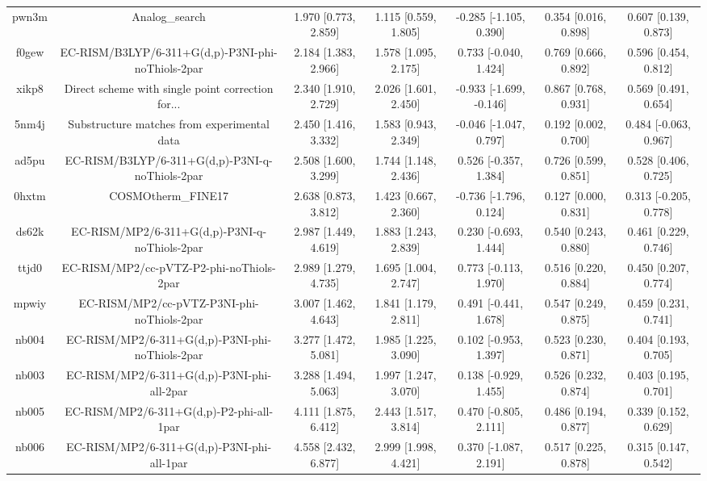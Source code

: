 \documentclass{article}
\begin{document}
\begin{center}
\begin{longtable}{|ccccccc|}
 pwn3m &                                     Analog\_search &  1.970 [0.773, 2.859] &  1.115 [0.559, 1.805] &   -0.285 [-1.105, 0.390] &  0.354 [0.016, 0.898] &   0.607 [0.139, 0.873] \\
 f0gew &  EC-RISM/B3LYP/6-311+G(d,p)-P3NI-phi-noThiols-2par &  2.184 [1.383, 2.966] &  1.578 [1.095, 2.175] &    0.733 [-0.040, 1.424] &  0.769 [0.666, 0.892] &   0.596 [0.454, 0.812] \\
 xikp8 &  Direct scheme with single point correction for... &  2.340 [1.910, 2.729] &  2.026 [1.601, 2.450] &  -0.933 [-1.699, -0.146] &  0.867 [0.768, 0.931] &   0.569 [0.491, 0.654] \\
 5nm4j &        Substructure matches from experimental data &  2.450 [1.416, 3.332] &  1.583 [0.943, 2.349] &   -0.046 [-1.047, 0.797] &  0.192 [0.002, 0.700] &  0.484 [-0.063, 0.967] \\
 ad5pu &    EC-RISM/B3LYP/6-311+G(d,p)-P3NI-q-noThiols-2par &  2.508 [1.600, 3.299] &  1.744 [1.148, 2.436] &    0.526 [-0.357, 1.384] &  0.726 [0.599, 0.851] &   0.528 [0.406, 0.725] \\
 0hxtm &                                 COSMOtherm\_FINE17 &  2.638 [0.873, 3.812] &  1.423 [0.667, 2.360] &   -0.736 [-1.796, 0.124] &  0.127 [0.000, 0.831] &  0.313 [-0.205, 0.778] \\
 ds62k &      EC-RISM/MP2/6-311+G(d,p)-P3NI-q-noThiols-2par &  2.987 [1.449, 4.619] &  1.883 [1.243, 2.839] &    0.230 [-0.693, 1.444] &  0.540 [0.243, 0.880] &   0.461 [0.229, 0.746] \\
 ttjd0 &           EC-RISM/MP2/cc-pVTZ-P2-phi-noThiols-2par &  2.989 [1.279, 4.735] &  1.695 [1.004, 2.747] &    0.773 [-0.113, 1.970] &  0.516 [0.220, 0.884] &   0.450 [0.207, 0.774] \\
 mpwiy &         EC-RISM/MP2/cc-pVTZ-P3NI-phi-noThiols-2par &  3.007 [1.462, 4.643] &  1.841 [1.179, 2.811] &    0.491 [-0.441, 1.678] &  0.547 [0.249, 0.875] &   0.459 [0.231, 0.741] \\
 nb004 &    EC-RISM/MP2/6-311+G(d,p)-P3NI-phi-noThiols-2par &  3.277 [1.472, 5.081] &  1.985 [1.225, 3.090] &    0.102 [-0.953, 1.397] &  0.523 [0.230, 0.871] &   0.404 [0.193, 0.705] \\
 nb003 &         EC-RISM/MP2/6-311+G(d,p)-P3NI-phi-all-2par &  3.288 [1.494, 5.063] &  1.997 [1.247, 3.070] &    0.138 [-0.929, 1.455] &  0.526 [0.232, 0.874] &   0.403 [0.195, 0.701] \\
 nb005 &           EC-RISM/MP2/6-311+G(d,p)-P2-phi-all-1par &  4.111 [1.875, 6.412] &  2.443 [1.517, 3.814] &    0.470 [-0.805, 2.111] &  0.486 [0.194, 0.877] &   0.339 [0.152, 0.629] \\
 nb006 &         EC-RISM/MP2/6-311+G(d,p)-P3NI-phi-all-1par &  4.558 [2.432, 6.877] &  2.999 [1.998, 4.421] &    0.370 [-1.087, 2.191] &  0.517 [0.225, 0.878] &   0.315 [0.147, 0.542] \\
\end{longtable}
\end{center}
\end{document}
